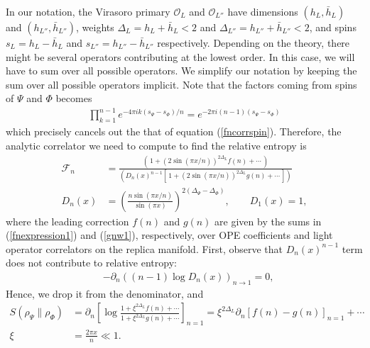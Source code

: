 \documentclass[11pt]{article}
\newcommand{\p}{\partial}
\newcommand{\mO}{\mathcal{O}}
\newcommand{\nn}{\nonumber}
\newcommand{\lb}{\left(}
\newcommand{\rb}{\right)}
\begin{document}
  In our notation, the Virasoro primary $\mO_{L}$ and $\mO_{L''}$ have
  dimensions $(h_{L},\bar{h}_{L})$ and $(h_{L''},\bar{h}_{L''})$, weights $\Delta_{L}=h_{L}+\bar{h}_{L}<2$ and $\Delta_{L''}=h_{L''}+\bar{h}_{L''}<2$, and spins $s_{L}=h_{L}-\bar{h}_{L}$ and $s_{L''}=h_{L''}-\bar{h}_{L''}$ respectively. Depending on the theory, there might be several operators contributing at the lowest order. In this case, we will have to sum over all possible operators.
We simplify our notation by keeping the sum over all possible operators implicit. Note that the factors coming from spins of $\Psi$ and $\Phi$ becomes
\begin{align}
 \prod_{k=1}^{n-1} e^{-4\pi i k (s_\Psi-s_\Phi)/n}=e^{-2\pi i (n-1)(s_\Psi-s_\Phi)}
\end{align}
which precisely cancels out the that of equation (\ref{fncorrspin}).
Therefore, the analytic correlator we need to compute to find the relative entropy is
  \begin{align}
    \label{eq:F_n}\mathcal{F}_{n} & =\frac{\lb\,1+(2\sin(\pi x/n))^{2\Delta_L}f(n)+\cdots\,\rb}{\lb D_n(x)^{n-1}\left[\,1+(2\sin(\pi x/n))^{2\Delta_L}g(n)+\cdots\,\right] \rb}\\
    \label{Dn}
    D_{n}(x)&=\left(\frac{n\sin(\pi x/n)}{\sin(\pi x)}\right)^{2(\Delta_\Psi-\Delta_\Phi)}
    ,\qquad D_{1}(x)=1,
  \end{align}
  where the leading correction $f(n)$ and $g(n)$ are given by the sums in (\ref{fnexpression1}) and (\ref{gnw1}), respectively, over OPE coefficients and light operator correlators on the replica manifold. 
  First, observe that $D_n(x)^{n-1}$ term does not contribute to relative entropy:
  \begin{align}
  &-\p_n\lb (n-1)\log D_n(x)\rb_{n\to 1}=0,
  \end{align}
Hence, we drop it from the denominator, and
  \begin{align}
    S(\rho_\Psi  \| \rho_\Phi)&=\p_n\left[\log \frac{1+\xi^{2\Delta_L} f(n)+\cdots}{1+\xi^{2\Delta_L} g(n)+\cdots}\right]_{n=1}=\xi^{2\Delta_L}\p_n\left[f(n)-g(n)\right]_{n=1}+\cdots\nn\\
    \xi&=\frac{2\pi x}{n}\ll 1.
  \end{align}
\end{document}
